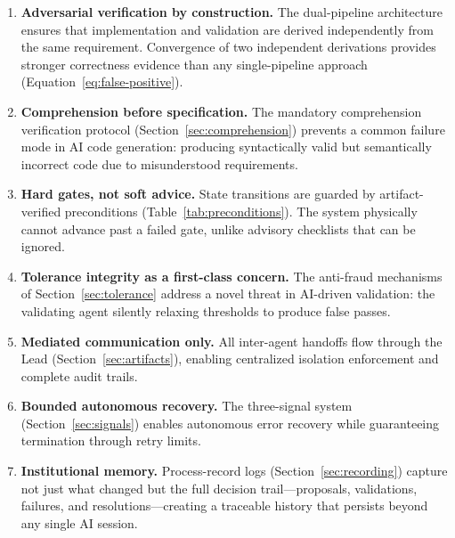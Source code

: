 \begin{enumerate}[leftmargin=*,label=\textbf{P\arabic*.},itemsep=4pt]
  \item \textbf{Adversarial verification by construction.}
    The dual-pipeline architecture ensures that implementation and
    validation are derived independently from the same requirement.
    Convergence of two independent derivations provides stronger
    correctness evidence than any single-pipeline approach
    (Equation~\ref{eq:false-positive}).

  \item \textbf{Comprehension before specification.}
    The mandatory comprehension verification protocol
    (Section~\ref{sec:comprehension}) prevents a common failure mode
    in AI code generation: producing syntactically valid but
    semantically incorrect code due to misunderstood requirements.

  \item \textbf{Hard gates, not soft advice.}
    State transitions are guarded by artifact-verified preconditions
    (Table~\ref{tab:preconditions}). The system physically cannot
    advance past a failed gate, unlike advisory checklists that can
    be ignored.

  \item \textbf{Tolerance integrity as a first-class concern.}
    The anti-fraud mechanisms of Section~\ref{sec:tolerance} address
    a novel threat in AI-driven validation: the validating agent
    silently relaxing thresholds to produce false passes.

  \item \textbf{Mediated communication only.}
    All inter-agent handoffs flow through the Lead
    (Section~\ref{sec:artifacts}), enabling centralized isolation
    enforcement and complete audit trails.

  \item \textbf{Bounded autonomous recovery.}
    The three-signal system (Section~\ref{sec:signals}) enables
    autonomous error recovery while guaranteeing termination through
    retry limits.

  \item \textbf{Institutional memory.}
    Process-record logs (Section~\ref{sec:recording}) capture not
    just what changed but the full decision trail---proposals,
    validations, failures, and resolutions---creating a traceable
    history that persists beyond any single AI session.
\end{enumerate}

